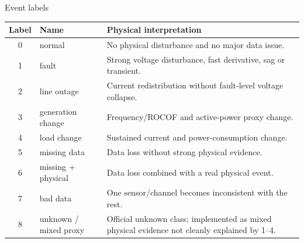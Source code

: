 \documentclass[aspectratio=169,10pt,t]{beamer}
\begin{document}
\begin{frame}{Event labels}
\small
\centering
\begin{tabular}{clp{}}
\toprule
\textbf{Label} & \textbf{Name} & \textbf{Physical interpretation}\\
\midrule
0 & normal & No physical disturbance and no major data issue.\\
1 & fault & Strong voltage disturbance, fast derivative, sag or transient.\\
2 & line outage & Current redistribution without fault-level voltage collapse.\\
3 & generation change & Frequency/ROCOF and active-power proxy change.\\
4 & load change & Sustained current and power-consumption change.\\
5 & missing data & Data loss without strong physical evidence.\\
6 & missing + physical & Data loss combined with a real physical event.\\
7 & bad data & One sensor/channel becomes inconsistent with the rest.\\
8 & unknown / mixed proxy & Official unknown class; implemented as mixed physical evidence not cleanly explained by 1--4.\\
\bottomrule
\end{tabular}
\end{frame}
\end{document}
